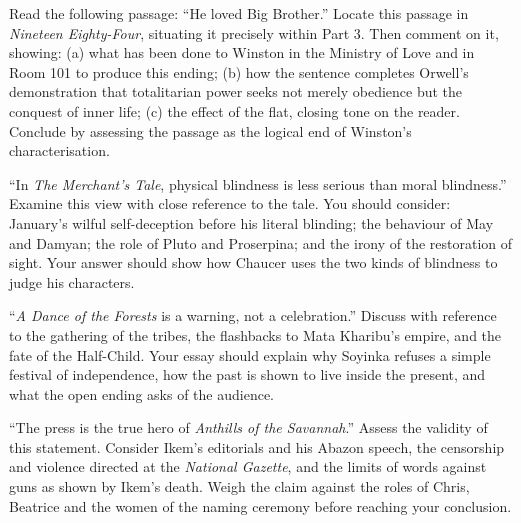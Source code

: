 \documentclass[11pt]{article}
\begin{document}
\begin{exercice}
Read the following passage: ``He loved Big Brother.'' Locate this passage in \emph{Nineteen Eighty-Four}, situating it precisely within Part 3. Then comment on it, showing: (a) what has been done to Winston in the Ministry of Love and in Room 101 to produce this ending; (b) how the sentence completes Orwell's demonstration that totalitarian power seeks not merely obedience but the conquest of inner life; (c) the effect of the flat, closing tone on the reader. Conclude by assessing the passage as the logical end of Winston's characterisation.
\end{exercice}

\begin{exercice}
``In \emph{The Merchant's Tale}, physical blindness is less serious than moral blindness.'' Examine this view with close reference to the tale. You should consider: January's wilful self-deception before his literal blinding; the behaviour of May and Damyan; the role of Pluto and Proserpina; and the irony of the restoration of sight. Your answer should show how Chaucer uses the two kinds of blindness to judge his characters.
\end{exercice}

\begin{exercice}
``\emph{A Dance of the Forests} is a warning, not a celebration.'' Discuss with reference to the gathering of the tribes, the flashbacks to Mata Kharibu's empire, and the fate of the Half-Child. Your essay should explain why Soyinka refuses a simple festival of independence, how the past is shown to live inside the present, and what the open ending asks of the audience.
\end{exercice}

\begin{exercice}
``The press is the true hero of \emph{Anthills of the Savannah}.'' Assess the validity of this statement. Consider Ikem's editorials and his Abazon speech, the censorship and violence directed at the \emph{National Gazette}, and the limits of words against guns as shown by Ikem's death. Weigh the claim against the roles of Chris, Beatrice and the women of the naming ceremony before reaching your conclusion.
\end{exercice}
\end{document}
